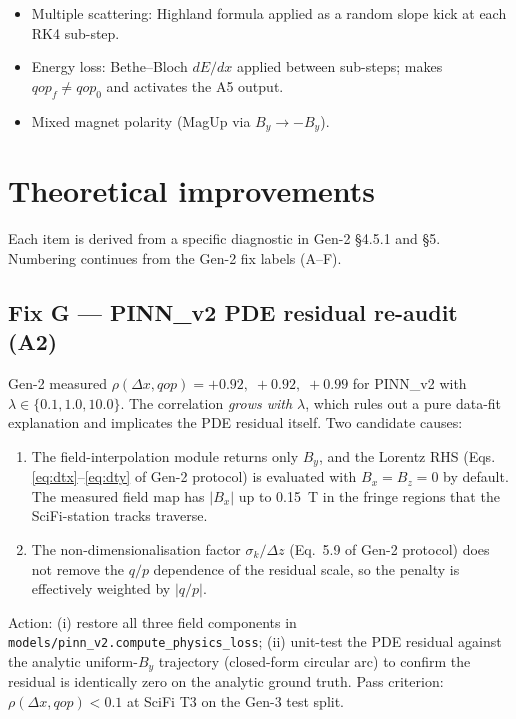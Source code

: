 \documentclass[a4paper,11pt]{article}
\newcommand{\SI}[2]{#1~#2}
\newcommand{\tesla}{T}
\newcommand{\dz}{\Delta z}
\begin{document}
\begin{itemize}
  \item Multiple scattering: Highland formula applied as a random
        slope kick at each RK4 sub-step.
  \item Energy loss: Bethe--Bloch $dE/dx$ applied between sub-steps;
        makes $qop_f \ne qop_0$ and activates the A5 output.
  \item Mixed magnet polarity (MagUp via $B_y \to -B_y$).
\end{itemize}

\section{Theoretical improvements}\label{gen3:sec:theory}

Each item is derived from a specific diagnostic in Gen-2 §4.5.1 and
§5.  Numbering continues from the Gen-2 fix labels (A--F).

\subsection{Fix G --- PINN\_v2 PDE residual re-audit (A2)}

Gen-2 measured $\rho(\Delta x, qop) = +0.92,\; +0.92,\; +0.99$ for
PINN\_v2 with $\lambda\in\{0.1,1.0,10.0\}$.  The correlation
\emph{grows with $\lambda$}, which rules out a pure data-fit
explanation and implicates the PDE residual itself.  Two candidate
causes:
\begin{enumerate}
  \item The field-interpolation module returns only $B_y$, and the
        Lorentz RHS (Eqs.\,\ref{eq:dtx}--\ref{eq:dty} of Gen-2
        protocol) is evaluated with $B_x = B_z = 0$ by default.  The
        measured field map has $|B_x|$ up to \SI{0.15}{\tesla} in
        the fringe regions that the SciFi-station tracks traverse.
  \item The non-dimensionalisation factor $\sigma_k/\dz$
        (Eq.~5.9 of Gen-2 protocol) does not remove the $q/p$
        dependence of the residual scale, so the penalty is
        effectively weighted by $|q/p|$.
\end{enumerate}
Action: (i) restore all three field components in
\texttt{models/pinn\_v2.compute\_physics\_loss}; (ii) unit-test the
PDE residual against the analytic uniform-$B_y$ trajectory
(closed-form circular arc) to confirm the residual is identically
zero on the analytic ground truth.  Pass criterion: $\rho(\Delta x,
qop)<0.1$ at SciFi T3 on the Gen-3 test split.
\end{document}
